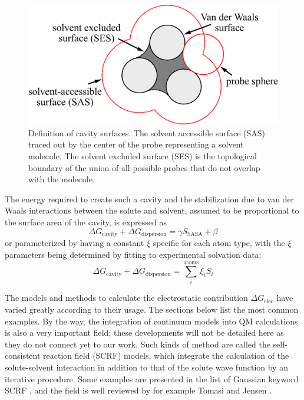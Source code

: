 \begin{figure}[h]
\begin{centering}
\includegraphics[width=0.55\columnwidth]{_figure/SASA}
\par\end{centering}
\caption[Definition of cavity surfaces]{Definition of cavity surfaces\label{fig:sasa}. The solvent accessible
surface (SAS) traced out by the center of the probe representing a
solvent molecule. The solvent excluded surface (SES) is the topological
boundary of the union of all possible probes that do not overlap with
the molecule.}
\end{figure}

The energy required to create such a cavity and the stabilization
due to van der Waals interactions between the solute and solvent,
assumed to be proportional to the surface area of the cavity, is expressed
as
\begin{equation}
\Delta G_{\mathrm{cavity}}+\Delta G_{\mathrm{dispersion}}=\gamma S_{\mathrm{SASA}}+\beta
\end{equation}
or parameterized by having a constant $\xi$ specific for each atom
type, with the $\xi$ parameters being determined by fitting to experimental
solvation data:
\begin{equation}
\Delta G_{\mathrm{cavity}}+\Delta G_{\mathrm{dispersion}}=\sum_{i}^{\mathrm{atoms}}\xi_{i}S_{i}
\end{equation}

The models and methods to calculate the electrostatic contribution
$\Delta G_{\mathrm{elec}}$ have varied greatly according to their
usage. The sections below list the most common examples. By the way,
the integration of continuum models into \acs{QM} calculations is
also a very important field; these developments will not be detailed
here as they do not connect yet to our work. Such kinds of method
are called the self-consistent reaction field (SCRF) models, which
integrate the calculation of the solute-solvent interaction in addition
to that of the solute wave function by an iterative procedure. Some
examples are presented in the list of Gaussian keyword SCRF \citep{scrf},
and the field is well reviewed by for example Tomasi \citep{Tomasi_1994_implicit_model,tomasi_quantum_2005}
and Jensen \citep{Jensen}.


